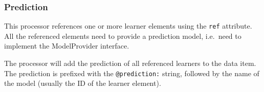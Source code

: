 \subsubsection{Prediction}

This processor references one or more learner elements using the
\texttt{ref} attribute. All the referenced elements need to provide a
prediction model, i.e.~need to implement the ModelProvider interface.

The processor will add the prediction of all referenced learners to the
data item. The prediction is prefixed with the \texttt{@prediction:}
string, followed by the name of the model (usually the ID of the learner
element).

